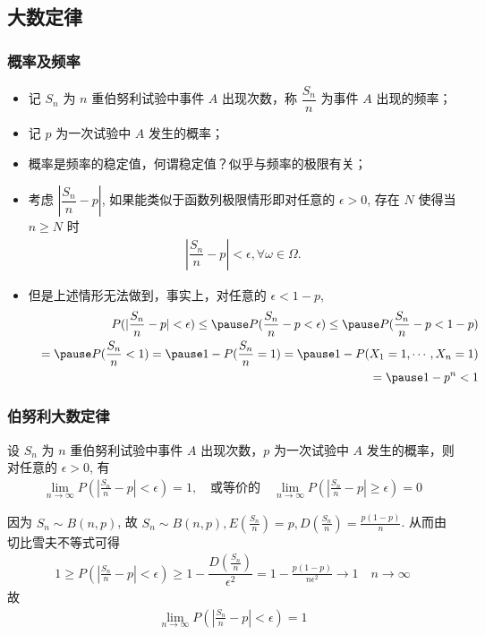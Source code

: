 \subsection{大数定律}
\begin{frame}
	\frametitle{概率及频率}
	\begin{itemize}[<+-|alert@+>]
		\item 记 $S_n$ 为 $n$ 重伯努利试验中事件 $A$ 出现次数，称 $\dfrac{S_n}{n}$ 为事件 $A$ 出现的频率；
		\item 记 $p$ 为一次试验中 $A$ 发生的概率；
		\item 概率是频率的稳定值，何谓稳定值？似乎与频率的极限有关；
		\item 考虑 $|\dfrac{S_n}{n}-p|$, 如果能类似于函数列极限情形即对任意的 $\epsilon>0$, 存在 $N$ 使得当 $n\ge N$ 时
		\begin{eqnarray*}
			|\dfrac{S_n}{n}-p|< \epsilon, \forall \omega\in \Omega.
		\end{eqnarray*}
		\item 但是上述情形无法做到，事实上，对任意的 $\epsilon<1-p$,
		\begin{eqnarray*}
			&& P(|\dfrac{S_n}{n}-p|< \epsilon)\le \pause P(\dfrac{S_n}{n}-p<\epsilon)\le \pause P(\dfrac{S_n}{n}-p<1-p)\\
			&&=\pause P(\frac{S_n}{n}<1)=\pause 1-P(\frac{S_n}{n}=1)=\pause 1-P(X_1=1,\cdots,X_n=1)\\
			&&=\pause 1-p^n<1
		\end{eqnarray*}
	\end{itemize}
\end{frame}
\begin{frame}
	\frametitle{伯努利大数定律}
	\begin{thm}
		设 $S_n$ 为 $n$ 重伯努利试验中事件 $A$ 出现次数，$p$ 为一次试验中 $A$ 发生的概率，则对任意的 $\epsilon>0$, 有
		\begin{eqnarray*}
			\lim_{n\rightarrow\infty} P (|\frac{S_n}{n}-p|<\epsilon)=1, \quad\mbox{或等价的}\quad \lim_{n\rightarrow\infty} P (|\frac{S_n}{n}-p|\ge\epsilon)=0
		\end{eqnarray*}
	\end{thm}
	\pause \zheng 因为 $S_n\sim B (n,p)$, 故 $S_n\sim B (n,p), E (\frac{S_n}{n})=p, D (\frac{S_n}{n})=\frac{p (1-p)}{n}$. \pause 从而由切比雪夫不等式可得
	\begin{eqnarray*}
		1\ge P(|\frac{S_n}{n}-p|<\epsilon)\ge 1-\dfrac{D(\frac{S_n}{n})}{\epsilon^2}=1-\frac{p(1-p)}{n\epsilon^2}\rightarrow 1  \quad n\rightarrow \infty
	\end{eqnarray*}
	\pause 故
	\begin{eqnarray*}
		\lim_{n\rightarrow\infty}P(|\frac{S_n}{n}-p|<\epsilon)=1
	\end{eqnarray*}
\end{frame}


